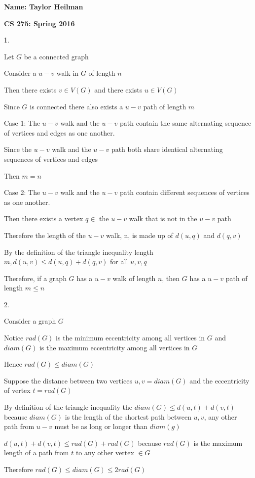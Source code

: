 \documentclass[12pt]{article}
\begin{document}
\textbf{Name: Taylor Heilman}    \hspace{4in} 
\begin{center} \textbf{CS 275: Spring 2016} \end{center}

{
1. 

Let $G$ be a connected graph

Consider a $u-v$ walk in $G$ of length $n$

Then there exists $v \in V(G)$ and there exists $u \in V(G)$

Since $G$ is connected there also exists a $u-v$ path of length $m$

Case 1: The $u-v$ walk and the $u-v$ path contain the same alternating sequence of vertices and edges as one another.
		
Since the $u-v$ walk and the $u-v$ path both share identical alternating sequences of vertices and edges

Then $m = n$ 

Case 2: The $u-v$ walk and the $u-v$ path contain different sequences of vertices as one another.

Then there exists a vertex $q \in$ the $u-v$ walk that is not in the  $u-v$ path

Therefore the length of the  $u-v$ walk, n, is made up of $d(u,q)$ and $d(q,v)$

By the definition of the triangle inequality length $m, d(u,v) \leq d(u,q) + d(q,v)$ for all $u,v,q$

Therefore, if a graph $G$ has a $u-v$ walk of length $n$, then $G$ has a $u-v$ path of length $m \leq n$


}

2.

{
Consider a graph $G$ 

Notice $rad(G)$ is the minimum eccentricity among all vertices in $G$ and $diam(G)$ is the maximum eccentricity among all vertices in $G$
	
Hence $rad(G) \leq diam(G)$

Suppose the distance between two vertices $u,v = diam(G)$ and the eccentricity of vertex $t = rad(G)$

By definition of the triangle inequality the $diam(G) \leq d(u,t) + d(v,t)$ because $diam(G)$ is the length of the shortest path between $u,v$, any other path from $u-v$ must be as long or longer than $diam(g)$

$d(u,t) + d(v,t) \leq rad(G) + rad(G)$  because $rad(G)$ is the maximum length of a path from $t$ to any other vertex $\in G$

Therefore $rad(G) \leq diam(G) \leq 2rad(G)$

}
\end{document}
